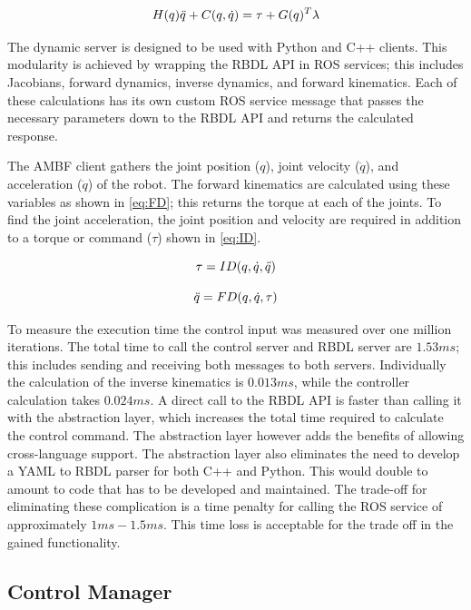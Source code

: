 \begin{equation}
    H(q) \Ddot{q} + C(q,\Dot{q}) = \tau + G(q)^T \lambda
    \label{eq:motion}
\end{equation}



The dynamic server is designed to be used with Python and C++ clients. This modularity is achieved by wrapping the RBDL API in ROS services; this includes Jacobians, forward dynamics, inverse dynamics, and forward kinematics. Each of these calculations has its own custom ROS service message that passes the necessary parameters down to the RBDL API and returns the calculated response. 

The AMBF client gathers the joint position ($q$), joint velocity ($\Dot{q}$), and acceleration ($\DDot{q}$) of the robot.  The forward kinematics are calculated using these variables as shown in \autoref{eq:FD}; this returns the torque at each of the joints. To find the joint acceleration, the joint position and velocity are required in addition to a torque or command ($\tau$) shown in \autoref{eq:ID}.  

\begin{equation}
    \tau = ID(q,\Dot{q}, \Ddot{q})
    \label{eq:ID}
\end{equation}


\begin{equation}
    \Ddot{q} = FD(q,\Dot{q}, \tau )
    \label{eq:FD}
\end{equation}


 To measure the execution time the control input was measured over one million iterations. The total time to call the control server and RBDL server are $1.53ms$; this includes sending and receiving both messages to both servers. Individually the calculation of the inverse kinematics is $0.013ms$, while the controller calculation takes $0.024ms$.  A direct call to the RBDL API is faster than calling it with the abstraction layer, which increases the total time required to calculate the control command. The abstraction layer however adds the benefits of allowing cross-language support. The abstraction layer also eliminates the need to develop a YAML to RBDL parser for both C++ and Python. This would double to amount to code that has to be developed and maintained. The trade-off for eliminating these complication is a time penalty for calling the ROS service of approximately $1ms-1.5ms$. This time loss is acceptable for the trade off in the gained functionality. 
 
 
 \subsection{Control Manager}
 
